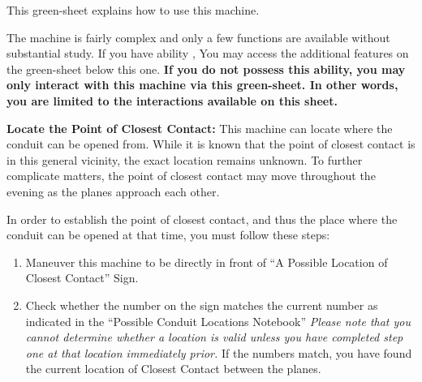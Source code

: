 \documentclass[green]{elementals}
\begin{document}
\name{\gConduitCover{}}

This green-sheet explains how to use this machine.

The machine is fairly complex and only a few functions are available without substantial study. If you have ability \aWorkConduit{}, You may access the additional features on the green-sheet below this one. {\bf If you do not possess this ability, you may only interact with this machine via this green-sheet. In other words, you are limited to the interactions available on this sheet.}

{\bf Locate the Point of Closest Contact:}
This machine can locate where the conduit can be opened from. While it is known that the point of closest contact is in this general vicinity, the exact location remains unknown. To further complicate matters, the point of closest contact may move throughout the evening as the planes approach each other.

In order to establish the point of closest contact, and thus the place where the conduit can be opened at that time, you must follow these steps:
\begin{enumerate}
  \item Maneuver this machine to be directly in front of ``A Possible Location of Closest Contact'' Sign.
  \item Check whether the number on the sign matches the current number as indicated in the ``Possible Conduit Locations Notebook'' \emph{Please note that you cannot determine whether a location is valid unless you have completed step one at that location immediately prior.} If the numbers match, you have found the current location of Closest Contact between the planes.
\end{enumerate}
\end{document}
